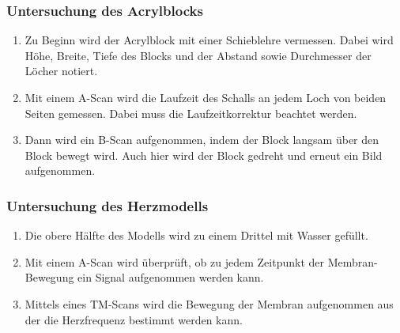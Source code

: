 \subsubsection{Untersuchung des Acrylblocks}

\begin{enumerate}
  \item Zu Beginn wird der Acrylblock mit einer Schieblehre vermessen.
    Dabei wird Höhe, Breite, Tiefe des Blocks und der Abstand sowie
    Durchmesser der Löcher notiert.
  \item Mit einem A-Scan wird die Laufzeit des Schalls an jedem Loch von beiden
    Seiten gemessen. Dabei muss die Laufzeitkorrektur beachtet werden.
  \item Dann wird ein B-Scan aufgenommen, indem der Block langsam über den
    Block bewegt wird. Auch hier wird der Block gedreht und erneut ein Bild
    aufgenommen.
\end{enumerate}

\subsubsection{Untersuchung des Herzmodells}

\begin{enumerate}
  \item Die obere Hälfte des Modells wird zu einem Drittel mit Wasser gefüllt.
  \item Mit einem A-Scan wird überprüft, ob zu jedem Zeitpunkt der Membran-Bewegung
    ein Signal aufgenommen werden kann.
  \item Mittels eines TM-Scans wird die Bewegung der Membran aufgenommen aus der die
    Herzfrequenz bestimmt werden kann.
\end{enumerate}
